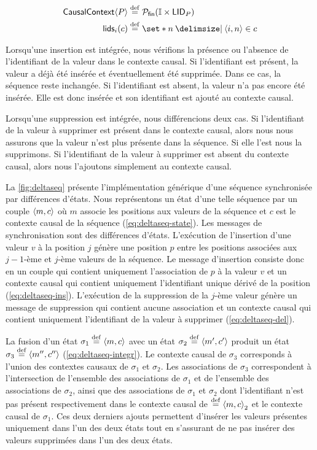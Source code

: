 \begin{align}
\trm{CausalContext}\tuple*{P} &\defeq \powerfset{\mathbb{I} \times \trm{LID}_P}\label{eq:cc-state}\\
\trm{lids}_i(c) &\defeq \set*{n \given \tuple*{i, n} \in c}\label{eq:cc-lids}
\end{align}

Lorsqu'une insertion est intégrée, nous vérifions la présence ou l'absence de l'identifiant de la valeur dans le contexte causal.
Si l'identifiant est présent, la valeur a déjà été insérée et éventuellement été supprimée.
Dans ce cas, la séquence reste inchangée.
Si l'identifiant est absent, la valeur n'a pas encore été insérée.
Elle est donc insérée et son identifiant est ajouté au contexte causal.

Lorsqu'une suppression est intégrée, nous différencions deux cas.
Si l'identifiant de la valeur à supprimer est présent dans le contexte causal, alors nous nous assurons que la valeur n'est plus présente dans la séquence.
Si elle l'est nous la supprimons.
Si l'identifiant de la valeur à supprimer est absent du contexte causal, alors nous l'ajoutons simplement au contexte causal.

La \autoref{fig:deltaseq} présente l'implémentation générique d'une séquence synchronisée par différences d'états.
Nous représentons un état d'une telle séquence par un couple $\tuple*{m, c}$ où $m$ associe les positions aux valeurs de la séquence et $c$ est le contexte causal de la séquence (\autoref{eq:deltaseq-state}).
Les messages de synchronisation sont des différences d'états.
L'exécution de l'insertion d'une valeur $v$ à la position $j$ génère une position $p$ entre les positions associées aux $j-1$-ème et $j$-ème valeurs de la séquence.
Le message d'insertion consiste donc en un couple qui contient uniquement l'association de $p$ à la valeur $v$ et un contexte causal qui contient uniquement l'identifiant unique dérivé de la position (\autoref{eq:deltaseq-ins}).
L'exécution de la suppression de la $j$-ème valeur génère un message de suppression qui contient aucune association et un contexte causal qui contient uniquement l'identifiant de la valeur à supprimer (\autoref{eq:deltaseq-del}).

La fusion d'un état $\sigma_1 \defeq \tuple*{m, c}$ avec un état $\sigma_2 \defeq \tuple*{m', c'}$ produit un état $\sigma_3 \defeq \tuple*{m'', c''}$ (\autoref{eq:deltaseq-integr}).
Le contexte causal de $\sigma_3$ corresponds à l'union des contextes causaux de $\sigma_1$ et $\sigma_2$.
Les associations de $\sigma_3$ correspondent à l'intersection de l'ensemble des associations de $\sigma_1$ et de l'ensemble des associations de $\sigma_2$, ainsi que des associations de $\sigma_1$ et $\sigma_2$ dont l'identifiant n'est pas présent respectivement dans le contexte causal de $ \defeq \tuple*{m, c}_2$ et le contexte causal de $\sigma_1$.
Ces deux derniers ajouts permettent d'insérer les valeurs présentes uniquement dans l'un des deux états tout en s'assurant de ne pas insérer des valeurs supprimées dans l'un des deux états.

